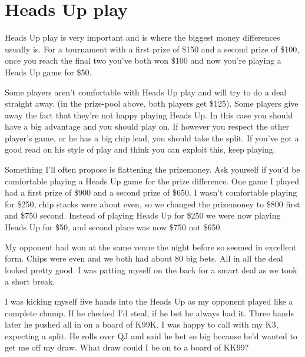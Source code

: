 \chapter{Heads Up play}


Heads Up play is very important and is where the biggest money
differences usually is. For a tournament with
a first prize of \$150 and a second prize of \$100, once
you reach the final two you've both won \$100 and now you're
playing a Heads Up game for \$50.



Some players aren't  comfortable with Heads Up play
and will try to do a deal straight away. (in the prize-pool
above, both players get \$125). Some players give away the
fact that they're not happy playing Heads Up. In this case
you should have a big advantage and you should play on.
If however you respect the other player's game, or he
has a big chip lead, you should take the split. If you've
got a good read on his style of play and think you
can exploit this, keep playing.

Something I'll often propose is flattening the prizemoney.
Ask yourself if you'd be comfortable playing a Heads Up
game for the prize difference. One game I played had
a first prize of \$900 and a second prize of \$650. I wasn't
comfortable playing for \$250, chip stacks were about even,
so we changed the prizemoney to \$800 first and \$750 second.
Instead of playing Heads Up for \$250 we were now playing
Heads Up for \$50, and second place was now \$750
not \$650.

My opponent had won at the same venue the night before
so seemed in excellent form. Chips were even and we both
had about 80 big bets. All in all the deal looked
pretty good. I was patting myself on the back for a smart
deal as we took a short break.

I was kicking myself five hands into the
Heads Up as my opponent played like a complete chump.
If he checked I'd steal, if he bet he always had it.
Three hands later he pushed all in on a board of K99K.
I was happy to call with my K3, expecting a split.
He rolls over QJ and said he bet so big because he'd
wanted to get me off my draw. What draw could I be
on to a board of KK99?

